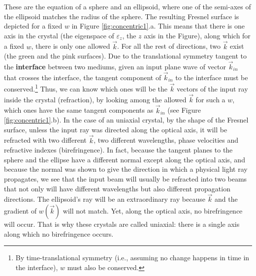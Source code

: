 \documentclass[11pt, a4paper, twoside]{article} %
\begin{document}
These are the equation of a sphere and an ellipsoid, where one of the semi-axes of the ellipsoid matches the radius of the sphere. The resulting Fresnel surface is depicted for a fixed $w$ in Figure \ref{fig:concentric1}.a. This means that there is one axis in the crystal (the eigenspace of $\varepsilon_z$, the $z$ axis in the Figure), along which for a fixed $w$, there is only one allowed $\vec{k}$. For all the rest of directions, two $\vec{k}$ exist (the green and the pink surfaces). Due to the translational symmetry tangent to the {\bf interface} between two mediums, given an input plane wave of vector $\vec{k}_{in}$ that crosses the interface, the tangent component of $\vec{k}_{in}$ to the interface must be conserved.\footnote{By time-translational symmetry (i.e., assuming no change happens in time in the interface), $w$ must also be conserved.} Thus, we can know which ones will be the $\vec{k}$ vectors of the input ray inside the crystal (refraction), by looking among the allowed $\vec{k}$ for such a $w$, which ones have the same tangent components as $\vec{k}_{in}$ (see Figure \ref{fig:concentric1}.b). In the case of an uniaxial crystal, by the shape of the Fresnel surface, unless the input ray was directed along the optical axis, it will be refracted with two different $\vec{k}$, two different wavelengths, phase velocities and refractive indexes (birefringence). In fact, because the tangent planes to the sphere and the ellipse have a different normal except along the optical axis, and because the normal was shown to give the direction in which a physical light ray propagates, we see that the input beam will usually be refracted into two beams that not only will have different wavelengths but also different propagation directions. The ellipsoid's ray will be an extraordinary ray because $\vec{k}$ and the gradient of $w(\vec{k})$ will not match. Yet, along the optical axis, no birefringence will occur. That is why these crystals are called uniaxial: there is a single axis along which no birefringence occurs.
\end{document}
